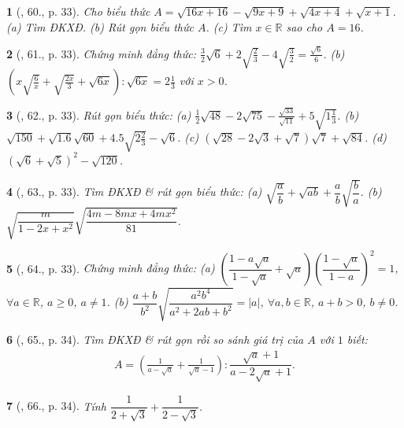 \documentclass{article}
\newtheorem{baitoan}{}%
\begin{document}
\begin{baitoan}[\cite{SGK_Toan_9_tap_1}, 60., p. 33]
	Cho biểu thức $A = \sqrt{16x + 16} - \sqrt{9x + 9} + \sqrt{4x + 4} + \sqrt{x + 1}$. (a) Tìm ĐKXĐ. (b) Rút gọn biểu thức $A$. (c) Tìm $x\in\mathbb{R}$ sao cho $A = 16$.
\end{baitoan}

\begin{baitoan}[\cite{SGK_Toan_9_tap_1}, 61., p. 33]
	Chứng minh đẳng thức: $\frac{3}{2}\sqrt{6} + 2\sqrt{\frac{2}{3}} - 4\sqrt{\frac{3}{2}} = \frac{\sqrt{6}}{6}$. (b) $\left(x\sqrt{\frac{6}{x}} + \sqrt{\frac{2x}{3}} + \sqrt{6x}\right):\sqrt{6x} = 2\frac{1}{3}$ với $x > 0$.
\end{baitoan}

\begin{baitoan}[\cite{SGK_Toan_9_tap_1}, 62., p. 33]
	Rút gọn biểu thức: (a) $\frac{1}{2}\sqrt{48} - 2\sqrt{75} - \frac{\sqrt{33}}{\sqrt{11}} + 5\sqrt{1\frac{1}{3}}$. (b) $\sqrt{150} + \sqrt{1.6}\sqrt{60} + 4.5\sqrt{2\frac{2}{3}} - \sqrt{6}$. (c) $(\sqrt{28} - 2\sqrt{3} + \sqrt{7})\sqrt{7} + \sqrt{84}$. (d) $(\sqrt{6} + \sqrt{5})^2 - \sqrt{120}$.
\end{baitoan}

\begin{baitoan}[\cite{SGK_Toan_9_tap_1}, 63., p. 33]
	Tìm ĐKXĐ \& rút gọn biểu thức: (a) $\sqrt{\dfrac{a}{b}} + \sqrt{ab} + \dfrac{a}{b}\sqrt{\dfrac{b}{a}}$. (b) $\sqrt{\dfrac{m}{1 - 2x + x^2}}\sqrt{\dfrac{4m - 8mx + 4mx^2}{81}}$.
\end{baitoan}

\begin{baitoan}[\cite{SGK_Toan_9_tap_1}, 64., p. 33]
	Chứng minh đẳng thức: (a) $\left(\dfrac{1 - a\sqrt{a}}{1 - \sqrt{a}} + \sqrt{a}\right)\left(\dfrac{1 - \sqrt{a}}{1 - a}\right)^2 = 1$, $\forall a\in\mathbb{R}$, $a\ge0$, $a\ne1$. (b) $\dfrac{a + b}{b^2}\sqrt{\dfrac{a^2b^4}{a^2 + 2ab + b^2}} = |a|$, $\forall a,b\in\mathbb{R}$, $a + b > 0$, $b\ne0$.
\end{baitoan}

\begin{baitoan}[\cite{SGK_Toan_9_tap_1}, 65., p. 34]
	Tìm ĐKXĐ \& rút gọn rồi so sánh giá trị của $A$ với $1$ biết:
	\begin{align*}
		A = \left(\frac{1}{a - \sqrt{a}} + \frac{1}{\sqrt{a} - 1}\right):\dfrac{\sqrt{a} + 1}{a - 2\sqrt{a} + 1}.
	\end{align*}
\end{baitoan}

\begin{baitoan}[\cite{SGK_Toan_9_tap_1}, 66., p. 34]
	Tính $\dfrac{1}{2 + \sqrt{3}} + \dfrac{1}{2 - \sqrt{3}}$.
\end{baitoan}
\end{document}
